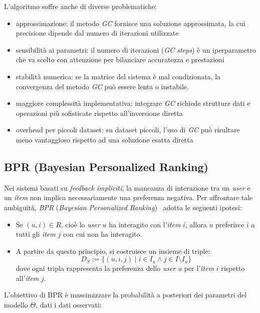 L'algoritmo soffre anche di diverse problematiche:

\begin{itemize}
    \item approssimazione: il metodo \textit{GC} fornisce una soluzione approssimata, la cui precisione dipende dal numero di iterazioni utilizzate
    \item sensibilità ai parametri: il numero di iterazioni (\textit{GC steps}) è un iperparametro che va scelto con attenzione per bilanciare accuratezza e prestazioni
    \item stabilità numerica: se la matrice del sistema è mal condizionata, la convergenza del metodo \textit{GC} può essere lenta o instabile.
    \item maggiore complessità implementativa: integrare \textit{GC} richiede strutture dati e operazioni più sofisticate rispetto all'inversione diretta
    \item overhead per piccoli dataset: su dataset piccoli, l'uso di \textit{GC} può risultare meno vantaggioso rispetto ad una soluzione esatta diretta
\end{itemize}

\subsection{BPR (Bayesian Personalized Ranking)}\label{bpr}

Nei sistemi basati su \textit{feedback impliciti}, la mancanza di interazione tra un \textit{user} e un \textit{item} non implica necessariamente una preferenza negativa. Per affrontare tale ambiguità, \textit{BPR} (\textit{Bayesian Personalized Ranking})~\cite{BPR} adotta le seguenti ipotesi:

\begin{itemize}
    \item Se $(u, i) \in R$, cioè lo \textit{user} $u$ ha interagito con l'\textit{item} $i$, allora $u$ preferisce $i$ a tutti gli \textit{item} $j$ con cui non ha interagito.
    \item A partire da questo principio, si costruisce un insieme di triple:
    \[
    D_S := \{(u, i, j) \mid i \in I_u \wedge j \in I \setminus I_u\}
    \]
    dove ogni tripla rappresenta la preferenza dello \textit{user} $u$ per l'\textit{item} $i$ rispetto all'\textit{item} $j$.
\end{itemize}

L'obiettivo di BPR è massimizzare la probabilità a posteriori dei parametri del modello $\Theta$, dati i dati osservati:

